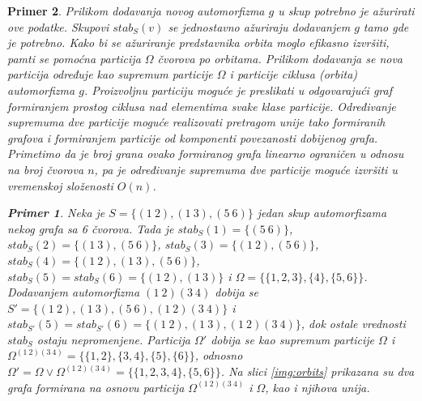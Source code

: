 \documentclass[12pt,oneside]{memoir}
\newtheorem{example}{Primer}
\theoremstyle{definition}
\begin{document}
\begin{example}
  Prilikom dodavanja novog automorfizma $g$ u skup potrebno je ažurirati ove
  podatke. Skupovi $stab_S(v)$ se jednostavno ažuriraju dodavanjem $g$ tamo gde
  je potrebno. Kako bi se ažuriranje predstavnika orbita moglo efikasno
  izvršiti, pamti se pomoćna particija $\Omega$ čvorova po orbitama. Prilikom
  dodavanja se nova particija određuje kao supremum particije $\Omega$ i
  particije ciklusa (orbita) automorfizma $g$.  Proizvoljnu particiju moguće je
  preslikati u odgovarajući graf formiranjem prostog ciklusa nad elementima
  svake klase particije. Određivanje supremuma dve particije moguće realizovati
  pretragom unije tako formiranih grafova i formiranjem particije od komponenti
  povezanosti dobijenog grafa. Primetimo da je broj grana ovako formiranog
  grafa linearno ograničen u odnosu na broj čvorova $n$, pa je određivanje
  supremuma dve particije moguće izvršiti u vremenskoj složenosti $O(n)$.

  \begin{example}
	  Neka je $S = \{(1\ 2), (1\ 3), (5\ 6)\}$ jedan skup automorfizama nekog
	  grafa sa 6 čvorova. Tada je $stab_S(1) = \{(5\ 6)\}$, $stab_S(2) = \{(1\
	  3), (5\ 6)\}$, $stab_S(3) =\{(1\ 2), (5\ 6)\}$, $stab_S(4) = \{(1\ 2),
	  (1\ 3), (5\ 6)\}$, $stab_S(5) = stab_S(6) = \{(1\ 2), (1\ 3)\}$ i $\Omega
	  = \{\{1, 2, 3\}, \{4\}, \{5, 6\}\}$. Dodavanjem automorfizma $(1\ 2)(3\
	  4)$ dobija se $S' = \{(1\ 2), (1\ 3), (5\ 6), (1\ 2)(3\ 4)\}$ i 
	  $stab_{S'}(5) = stab_{S'}(6) = \{(1\ 2), (1\ 3), (1\ 2)(3\ 4)\}$, dok
	  ostale vrednosti $stab_S$ ostaju nepromenjene. Particija $\Omega'$ dobija
	  se kao supremum particije $\Omega$ i $\Omega^{(1\ 2)(3\ 4)} = \{\{1, 2\},
	  \{3, 4\}, \{5\}, \{6\}\}$, odnosno $\Omega' = \Omega \lor \Omega^{(1\
	  2)(3\ 4)} = \{\{1, 2, 3, 4\}, \{5, 6\}\}$.  Na slici \ref{img:orbits}
	  prikazana su dva grafa formirana na osnovu particija $\Omega^{(1\ 2)(3\
	  4)}$ i $\Omega$, kao i njihova unija.
  \end{example}
  


\end{example}
\end{document}

